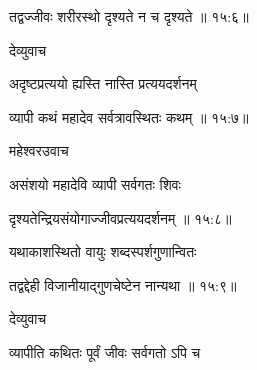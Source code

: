 
{\devanagarifont तद्वज्जीवः शरीरस्थो दृश्यते न च दृश्यते {॥ १५:६॥} \veg\dontdisplaylinenum }%

{\devanagarifont देव्युवाच {\dandab}\dontdisplaylinenum  }%
 
{\devanagarifont अदृष्टप्रत्ययो ह्यस्ति नास्ति प्रत्ययदर्शनम् \thinspace{\danda} \dontdisplaylinenum }%
 

{\devanagarifont व्यापी कथं महादेव सर्वत्रावस्थितः कथम् {॥ १५:७॥} \veg\dontdisplaylinenum }%

{\devanagarifont महेश्वरउवाच {\dandab}\dontdisplaylinenum  }%

{\devanagarifont असंशयो महादेवि व्यापी सर्वगतः शिवः \thinspace{\danda} \dontdisplaylinenum }%
 

{\devanagarifont दृश्यतेन्द्रियसंयोगाज्जीवप्रत्ययदर्शनम् {॥ १५:८॥} \veg\dontdisplaylinenum }%

{\devanagarifont यथाकाशस्थितो वायुः शब्दस्पर्शगुणान्वितः \thinspace{\dandab} \dontdisplaylinenum }%


{\devanagarifont तद्वद्देही विजानीयाद्गुणचेष्टेन नान्यथा {॥ १५:९॥} \veg\dontdisplaylinenum }%

{\devanagarifont देव्युवाच {\dandab}\dontdisplaylinenum  }%
 
{\devanagarifont व्यापीति कथितः पूर्वं जीवः सर्वगतो ऽपि च \thinspace{\danda} \dontdisplaylinenum }%

